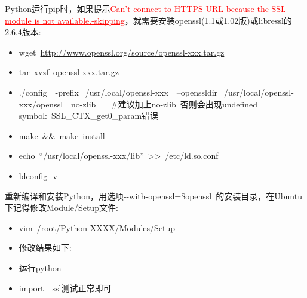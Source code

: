 \documentclass[10pt,a4paper]{article}
\begin{document}
\textrm{Python}运行\textrm{pip}时，如果提示\textcolor{red}{\underline{\textrm{Can't connect to HTTPS URL because the SSL module is not available.-skipping}}}，就需要安装\textrm{openssl}(1.1或1.02版)或\textrm{libressl}的2.6.4版本:
\begin{itemize}
	\item \textrm{wget~\url{http://www.openssl.org/source/openssl-xxx.tar.gz}}
	\item \textrm{tar~xvzf~openssl-xxx.tar.gz}
	\item \textrm{./config~~-prefix=/usr/local/openssl-xxx~~--openssldir=/usr/local/openssl-xxx/openssl~~no-zlib} ~~~\#建议加上\textrm{no-zlib}~否则会出现\textrm{undefined symbol:~SSL\_CTX\_get0\_param}错误
	\item \textrm{make~\&\&~make~install}
	\item \textrm{echo~``/usr/local/openssl-xxx/lib''~>>~/etc/ld.so.conf}
	\item \textrm{ldconfig -v}
\end{itemize}
重新编译和安装\textrm{Python}，用选项\textrm{-\/-with-openssl=\$openssl~}的安装目录，在\textrm{Ubuntu}下记得修改\textrm{Module/Setup}文件:~
\begin{itemize}
	\item \textrm{vim~/root/Python-XXXX/Modules/Setup}
	\item 修改结果如下:\\
    \item 运行\textrm{python}
    \item \textrm{import~~ssl}测试正常即可
\end{itemize}
\end{document}
